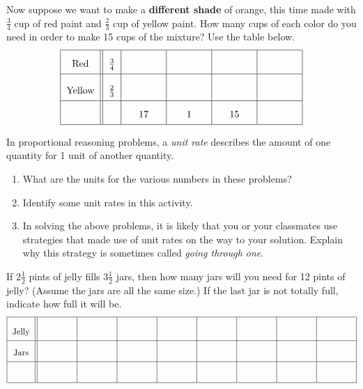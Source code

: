 \begin{prob}
Now suppose we want to make a \textbf{different shade} of orange, this time made with $\frac{3}{4}$ cup of red paint and $\frac{2}{3}$ cup of yellow paint.  How many cups of each color do you need in order to make 15 cups of the mixture?  Use the table below.  
\vspace{0.1in} 
\[{\renewcommand{\arraystretch}{2}
\begin{tabular}{|c||c|c|c|c|c|}\hline
Red  &  $\frac{3}{4}$ &  &  &  &   \\ \hline
Yellow & $\frac{2}{3}$  &\rule[7mm]{12mm}{0mm} &\rule[7mm]{12mm}{0mm} & \rule[7mm]{12mm}{0mm} & \rule[7mm]{12mm}{0mm}  \\ \hline
          &  & $17$  & $1$ & $15$   &  \\ \hline
\end{tabular}}
\]
\vspace{0.1in} 
\end{prob}



\begin{prob}
In proportional reasoning problems, a \emph{unit rate} describes the amount of one quantity for 1 unit of another quantity.  
\begin{enumerate}
\item What are the units for the various numbers in these problems?  
\item Identify some unit rates in this activity.  
\item In solving the above problems, it is likely that you or your classmates use strategies that made use of unit rates on the way to your solution.  Explain why this strategy is sometimes called \emph{going through one}.
\end{enumerate}
\end{prob}


\begin{prob}
If $2\frac{1}{2}$ pints of jelly fills $3\frac{1}{2}$ jars, then how many jars will you need for 12 pints of jelly?  (Assume the jars are all the same size.)  If the last jar is not totally full, indicate how full it will be.  
\vspace{0.1in} 
\[{\renewcommand{\arraystretch}{2}
\begin{tabular}{|c||c|c|c|c|c|c|c|c|}\hline
Jelly  &  \rule[7mm]{12mm}{0mm} &\rule[7mm]{12mm}{0mm} & \rule[7mm]{12mm}{0mm} & \rule[7mm]{12mm}{0mm}  
 & \rule[7mm]{12mm}{0mm} & \rule[7mm]{12mm}{0mm} & \rule[7mm]{12mm}{0mm} & \rule[7mm]{12mm}{0mm}   \\ \hline
Jars &  &  &  &  & & & & \\ \hline
           &  &  &  &  & & & & \\ \hline
\end{tabular}}
\]
\vspace{0.1in} 
\end{prob}


